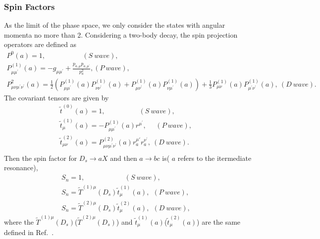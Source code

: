 {    \subsubsection{Spin Factors}
    \par{
        As the limit of the phase space, we only consider the states with angular momenta no more than 2. 
        Considering a two-body decay, the spin projection operators are defined as  
        \begin{equation}
            \begin{array}{lr}
                P^{0}(a) = 1,   \ \ \ \ \ \  \ \ \ \ \ \  \ \ \ \ \ \ \ \ \ \ \ \        (S\ wave), &\\
                P^{(1)}_{\mu\mu^{'}}(a) = -g_{\mu\mu^{'}}+\frac{p_{a,\mu}p_{a,\mu^{'}}}{p_{a}^{2}},          (P\ wave), &\\
                P^{2}_{\mu\nu\mu^{'}\nu^{'}}(a) = \frac{1}{2}(P^{(1)}_{\mu\mu^{'}}(a)P^{(1)}_{\nu\nu^{'}}(a)+P^{(1)}_{\mu\nu^{'}}(a)P^{(1)}_{\nu\mu^{'}}(a))+\frac{1}{3}P^{(1)}_{\mu\nu}(a)P^{(1)}_{\mu^{'}\nu^{'}}(a),\           (D\ wave). &
            \end{array}\label{spin-projection-operators} 
        \end{equation}
       The covariant tensors are given by 
        \begin{equation}
            \begin{array}{lr}
                \tilde{t}^{(0)}(a) = 1, \ \ \ \ \ \  \ \ \ \ \ \   \ \ \ \ \ \ \ \ \ \       (S\ wave), &\\
                \tilde{t}^{(1)}_{\mu}(a) = -P^{(1)}_{\mu\mu^{'}}(a)r^{\mu^{'}},   \ \  \ \ \ \         (P\ wave), &\\
                \tilde{t}^{(2)}_{\mu\nu}(a) = P^{(2)}_{\mu\nu\mu^{'}\nu^{'}}(a)r^{\mu{'}}_{a}r^{\nu^{'}}_{a}, \           (D\ wave). &\\
            \end{array}\label{covariant-tensors} 
        \end{equation}
        Then the spin factor for $D_{s} \rightarrow aX$ and then $a \rightarrow bc$ is( $a$ refers to the itermediate resonance), 
        \begin{equation}
            \begin{array}{lr}
                S_{n} = 1,         \ \ \ \ \ \  \ \ \ \ \ \ \ \ \ \ \ \  \ \ \ \ \ \ \ \ (S\ wave), &\\
                S_{n} = \tilde{T}^{(1)\mu}(D_{s})\tilde{t}^{(1)}_{\mu}(a),\ \          (P\ wave), &\\
                S_{n} = \tilde{T}^{(2)\mu}(D_{s})\tilde{t}^{(2)}_{\mu}(a),\ \         (D\ wave), &
            \end{array}\label{spin-factor} 
        \end{equation}
        where the $\tilde{T}^{(1)\mu}(D_{s})$($\tilde{T}^{(2)\mu}(D_{s})$) and $\tilde{t}^{(1)}_{\mu}(a)$($\tilde{t}^{(2)}_{\mu}(a)$) are the same defined in Ref.~\cite{covariant-tensors}.
    }

}



